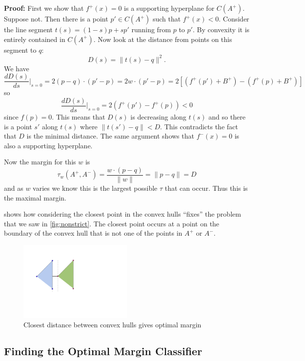 \documentclass[
]{article}
\begin{document}
\textbf{Proof:} First we show that \(f^{+}(x)=0\) is a supporting
hyperplane for \(C(A^{+})\). Suppose not. Then there is a point
\(p'\in C(A^{+})\) such that \(f^{+}(x)<0\). Consider the line segment
\(t(s) = (1-s)p+sp'\) running from \(p\) to \(p'\). By convexity it is
entirely contained in \(C(A^{+})\). Now look at the distance from points
on this segment to \(q\): \[
D(s)=\|t(s)-q\|^2.
\] We have \[
\frac{dD(s)}{ds}|_{s=0} = 2(p-q)\cdot (p'-p) = 2w\cdot (p'-p) = 2\left[(f^{+}(p')+B^{+})-(f^{+}(p)+B^{+})\right]
\] so \[
\frac{dD(s)}{ds}|_{s=0} = 2(f^{+}(p')-f^{+}(p))<0
\] since \(f(p)=0\). This means that \(D(s)\) is decreasing along
\(t(s)\) and so there is a point \(s'\) along \(t(s)\) where
\(\|t(s')-q\|<D\). This contradicts the fact that \(D\) is the minimal
distance. The same argument shows that \(f^{-}(x)=0\) is also a
supporting hyperplane.

Now the margin for this \(w\) is \[
\tau_{w}(A^{+},A^{-}) = \frac{w\cdot (p-q)}{\|w\|} = \|p-q\|=D
\] and as \(w\) varies we know this is the largest possible \(\tau\)
that can occur. Thus this is the maximal margin.

 shows how considering the closest point in the convex
hulls ``fixes'' the problem that we saw in \cref{fig:nonstrict}. The
closest point occurs at a point on the boundary of the convex hull that
is not one of the points in \(A^{+}\) or \(A^{-}\).

\begin{figure}
\hypertarget{fig:strict}{%
\centering
\includegraphics[width=0.5\textwidth,height=\textheight]{../img/ConvexHullWithMargin.png}
\caption{Closest distance between convex hulls gives optimal
margin}\label{fig:strict}
}
\end{figure}

\hypertarget{finding-the-optimal-margin-classifier}{%
\subsection{Finding the Optimal Margin
Classifier}\label{finding-the-optimal-margin-classifier}}
\end{document}
